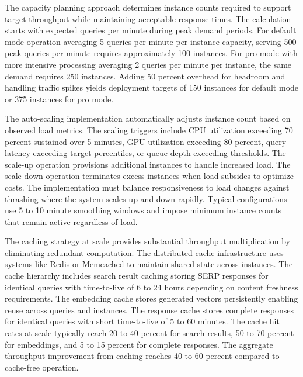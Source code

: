 The capacity planning approach determines instance counts required to support target throughput while maintaining acceptable response times. The calculation starts with expected queries per minute during peak demand periods. For default mode operation averaging 5 queries per minute per instance capacity, serving 500 peak queries per minute requires approximately 100 instances. For pro mode with more intensive processing averaging 2 queries per minute per instance, the same demand requires 250 instances. Adding 50 percent overhead for headroom and handling traffic spikes yields deployment targets of 150 instances for default mode or 375 instances for pro mode.

The auto-scaling implementation automatically adjusts instance count based on observed load metrics. The scaling triggers include CPU utilization exceeding 70 percent sustained over 5 minutes, GPU utilization exceeding 80 percent, query latency exceeding target percentiles, or queue depth exceeding thresholds. The scale-up operation provisions additional instances to handle increased load. The scale-down operation terminates excess instances when load subsides to optimize costs. The implementation must balance responsiveness to load changes against thrashing where the system scales up and down rapidly. Typical configurations use 5 to 10 minute smoothing windows and impose minimum instance counts that remain active regardless of load.

The caching strategy at scale provides substantial throughput multiplication by eliminating redundant computation. The distributed cache infrastructure uses systems like Redis or Memcached to maintain shared state across instances. The cache hierarchy includes search result caching storing SERP responses for identical queries with time-to-live of 6 to 24 hours depending on content freshness requirements. The embedding cache stores generated vectors persistently enabling reuse across queries and instances. The response cache stores complete responses for identical queries with short time-to-live of 5 to 60 minutes. The cache hit rates at scale typically reach 20 to 40 percent for search results, 50 to 70 percent for embeddings, and 5 to 15 percent for complete responses. The aggregate throughput improvement from caching reaches 40 to 60 percent compared to cache-free operation.

